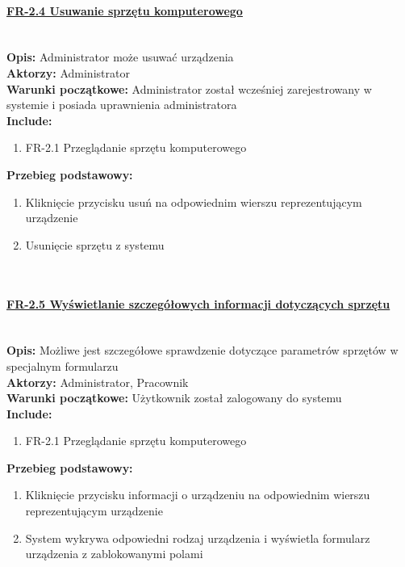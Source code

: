 \paragraph{\underline{FR-2.4 Usuwanie sprzętu komputerowego}}\mbox{}\\[1mm]
	\noindent\textbf{Opis:} Administrator może usuwać urządzenia\\
	\noindent\textbf{Aktorzy:} Administrator\\
	\textbf{Warunki początkowe:} Administrator został wcześniej zarejestrowany w systemie i posiada uprawnienia administratora\\
	\textbf{Include:} 
	\begin{enumerate}[noparskip]
		\item FR-2.1 Przeglądanie sprzętu komputerowego
	\end{enumerate}
    \textbf{Przebieg podstawowy:}
	\begin{enumerate}[noparskip]
		\item Kliknięcie przycisku usuń na odpowiednim wierszu reprezentującym urządzenie
		\item Usunięcie sprzętu z systemu
  \end{enumerate} \mbox{}\\[-11mm]

\paragraph{\underline{FR-2.5 Wyświetlanie szczegółowych informacji dotyczących sprzętu}}\mbox{}\\[1mm]
	\noindent\textbf{Opis:} Możliwe jest szczegółowe sprawdzenie dotyczące parametrów sprzętów w specjalnym formularzu\\
	\noindent\textbf{Aktorzy:} Administrator, Pracownik\\
	\textbf{Warunki początkowe:} Użytkownik został zalogowany do systemu\\
	\textbf{Include:} 
	\begin{enumerate}[noparskip]
		\item FR-2.1 Przeglądanie sprzętu komputerowego
	\end{enumerate}
  \textbf{Przebieg podstawowy:}
	\begin{enumerate}[noparskip]
		\item Kliknięcie przycisku informacji o urządzeniu na odpowiednim wierszu reprezentującym urządzenie
		\item System wykrywa odpowiedni rodzaj urządzenia i wyświetla formularz urządzenia z zablokowanymi polami 
  \end{enumerate} \mbox{}\\[-11mm]

